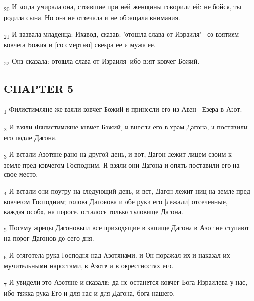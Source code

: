 \begin{tcolorbox}
\textsubscript{20} И когда умирала она, стоявшие при ней женщины говорили ей: не бойся, ты родила сына. Но она не отвечала и не обращала внимания.
\end{tcolorbox}
\begin{tcolorbox}
\textsubscript{21} И назвала младенца: Ихавод, сказав: 'отошла слава от Израиля' --со взятием ковчега Божия и [со смертью] свекра ее и мужа ее.
\end{tcolorbox}
\begin{tcolorbox}
\textsubscript{22} Она сказала: отошла слава от Израиля, ибо взят ковчег Божий.
\end{tcolorbox}
\subsection{CHAPTER 5}
\begin{tcolorbox}
\textsubscript{1} Филистимляне же взяли ковчег Божий и принесли его из Авен-- Езера в Азот.
\end{tcolorbox}
\begin{tcolorbox}
\textsubscript{2} И взяли Филистимляне ковчег Божий, и внесли его в храм Дагона, и поставили его подле Дагона.
\end{tcolorbox}
\begin{tcolorbox}
\textsubscript{3} И встали Азотяне рано на другой день, и вот, Дагон лежит лицем своим к земле пред ковчегом Господним. И взяли они Дагона и опять поставили его на свое место.
\end{tcolorbox}
\begin{tcolorbox}
\textsubscript{4} И встали они поутру на следующий день, и вот, Дагон лежит ниц на земле пред ковчегом Господним; голова Дагонова и обе руки его [лежали] отсеченные, каждая особо, на пороге, осталось только туловище Дагона.
\end{tcolorbox}
\begin{tcolorbox}
\textsubscript{5} Посему жрецы Дагоновы и все приходящие в капище Дагона в Азот не ступают на порог Дагонов до сего дня.
\end{tcolorbox}
\begin{tcolorbox}
\textsubscript{6} И отяготела рука Господня над Азотянами, и Он поражал их и наказал их мучительными наростами, в Азоте и в окрестностях его.
\end{tcolorbox}
\begin{tcolorbox}
\textsubscript{7} И увидели это Азотяне и сказали: да не останется ковчег Бога Израилева у нас, ибо тяжка рука Его и для нас и для Дагона, бога нашего.
\end{tcolorbox}
